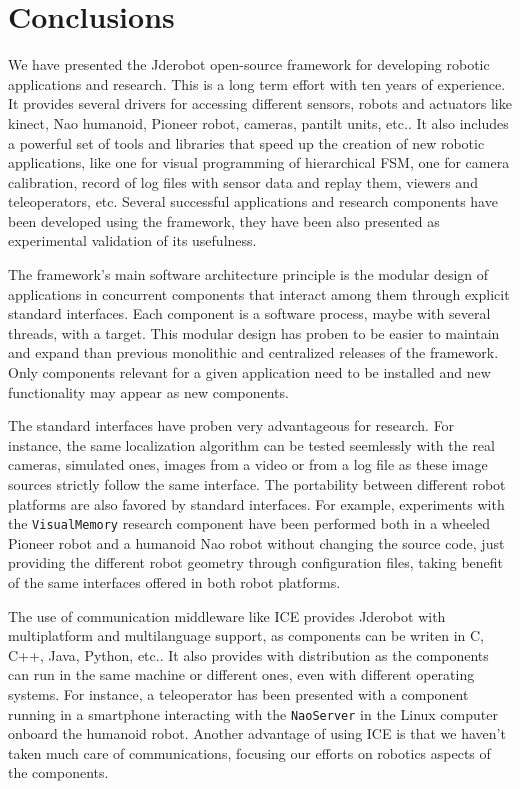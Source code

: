 \documentclass[twocolumn]{svjour3}          %
\begin{document}
\section{Conclusions}

We have presented the Jderobot open-source framework for developing robotic applications and research. This is a long term effort with ten years of experience. It provides several drivers for accessing different sensors, robots and actuators like kinect, Nao humanoid, Pioneer robot, cameras, pantilt units, etc.. It also includes a powerful set of tools and libraries that speed up the creation of new robotic applications, like one for visual programming of hierarchical FSM, one for camera calibration, record of log files with sensor data and replay them, viewers and teleoperators, etc. Several successful applications and research components have been developed using the framework, they have been also presented as experimental validation of its usefulness.

The framework's main software architecture principle is the modular design of applications in concurrent components that interact among them through explicit standard interfaces. Each component is a software process, maybe with several threads, with a target. This modular design has proben to be easier to maintain and expand than previous monolithic and centralized releases of the framework. Only components relevant for a given application need to be installed and new functionality may appear as new components.

The standard interfaces have proben very advantageous for research. For instance, the same localization algorithm can be tested seemlessly with the real cameras, simulated ones, images from a video or from a log file as these image sources strictly follow the same interface. The portability between different robot platforms are also favored by standard interfaces. For example, experiments with the \texttt{VisualMemory} research component have been performed both in a wheeled Pioneer robot and a humanoid Nao robot without changing the source code, just providing the different robot geometry through configuration files, taking benefit of the same interfaces offered in both robot platforms.

The use of communication middleware like ICE provides Jderobot with multiplatform and multilanguage support, as components can be writen in C, C++, Java, Python, etc.. It also provides with distribution as the components can run in the same machine or different ones, even with different operating systems. For instance, a teleoperator has been presented with a component running in a smartphone interacting with the \texttt{NaoServer} in the Linux computer onboard the humanoid robot. Another advantage of using ICE is that we haven't taken much care of communications, focusing our efforts on robotics aspects of the components.
\end{document}
